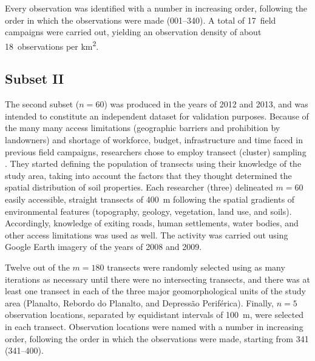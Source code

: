 Every observation was identified with a number in increasing order, following the order in which 
the observations were made (\num{001}--\num{340}). A total of \num{17}~field campaigns were carried out,
yielding an observation density of about \num{18}~observations per \si{\kilo\metre\squared}.

\tocless\subsection{Subset II}

The second subset ($n = 60$) was produced in the years of \num{2012} and \num{2013}, and was intended to 
constitute an independent dataset for validation purposes. Because of the many many access limitations 
(geographic barriers and prohibition by landowners) and shortage of workforce, budget, infrastructure and 
time faced in previous field campaigns, researchers chose to employ transect (cluster) sampling 
\cite{MiguelEtAl2012,Moura-BuenoEtAl2012,Samuel-RosaEtAl2013}. They started defining the population of 
transects using their knowledge of the study area, taking into account the factors that they thought 
determined the spatial distribution of soil properties. Each researcher (three) delineated $m = 60$ easily 
accessible, straight transects of \SI{400}{\metre} following the spatial gradients of environmental features 
(topography, geology, vegetation, land use, and soils). Accordingly, knowledge of exiting roads, human 
settlements, water bodies, and other access limitations was used as well. The activity was carried out using 
Google Earth\textregistered{} imagery of the years of \num{2008} and \num{2009}.


Twelve out of the $m = 180$ transects were randomly selected using as many iterations as necessary until 
there were no intersecting transects, and there was at least one transect in each of the three major 
geomorphological units of the study area (Planalto, Rebordo do Planalto, and Depressão Periférica). 
Finally, $n = 5$ observation locations, separated by equidistant intervals of \SI{100}{\metre}, were 
selected in each transect. Observation locations were named with a number in increasing order, 
following the order in which the observations were made, starting from \num{341} (\num{341}--\num{400}).


